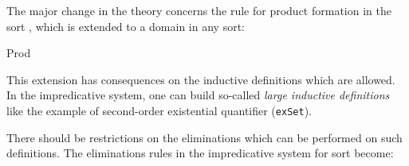 The major change in the theory concerns the rule for product formation
in the sort \Set, which is extended to a domain in any sort:
\begin{description}
\item [Prod]  
\end{description}
This extension has consequences on the inductive definitions which are
allowed. 
In the impredicative system, one can build so-called {\em large inductive
  definitions} like the example of second-order existential
quantifier (\texttt{exSet}).

There should be restrictions on the eliminations which can be
performed on such definitions. The eliminations rules in the
impredicative system for sort \Set{} become:
\begin{description}
\item[\Set] 
\end{description}
     
%
%

%
%

%
%

%
%
%



